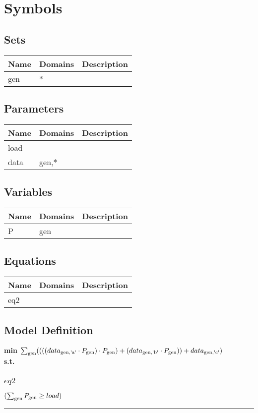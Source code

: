 \documentclass[11pt]{article}
\begin{document}
\section*{Symbols}


\subsection*{Sets}
\begin{tabularx}{\textwidth}{| l | l | X |}
\hline
\textbf{Name} & \textbf{Domains} & \textbf{Description}\\
\hline
\endhead

gen & * & \\
\hline
\end{tabularx}
\subsection*{Parameters}
\begin{tabularx}{\textwidth}{| l | l | X |}
\hline
\textbf{Name} & \textbf{Domains} & \textbf{Description}\\
\hline
\endhead

load &  & \\
data & gen,* & \\
\hline
\end{tabularx}
\subsection*{Variables}
\begin{tabularx}{\textwidth}{| l | l | X |}
\hline
\textbf{Name} & \textbf{Domains} & \textbf{Description}\\
\hline
\endhead

P & gen & \\
\hline
\end{tabularx}
\subsection*{Equations}
\begin{tabularx}{\textwidth}{| l | l | X |}
\hline
\textbf{Name} & \textbf{Domains} & \textbf{Description}\\
\hline
\endhead

eq2 &  & \\
\hline
\end{tabularx}
\subsection*{Model Definition}
\textbf{min} $\sum_\text{gen} ((((data_\text{\text{gen},\text{\textquotesingle a\textquotesingle}} \cdot P_\text{\text{gen}}) \cdot P_\text{\text{gen}}) + (data_\text{\text{gen},\text{\textquotesingle b\textquotesingle}} \cdot P_\text{\text{gen}})) + data_\text{\text{gen},\text{\textquotesingle c\textquotesingle}})$\\
\textbf{s.t.}
\subsubsection*{$eq2$}
$
(\sum_\text{gen} P_\text{\text{gen}} \geq load)
$
\vspace{5pt}
\hrule
\bigskip
\end{document}
